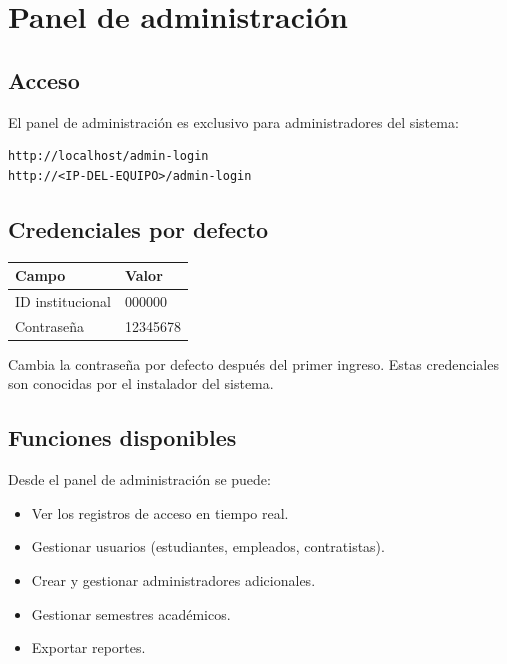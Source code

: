 \documentclass[12pt, a4paper]{article}
\begin{document}
\section{Panel de administración}

\subsection{Acceso}

El panel de administración es exclusivo para administradores del sistema:

\begin{lstlisting}
http://localhost/admin-login
http://<IP-DEL-EQUIPO>/admin-login
\end{lstlisting}

\subsection{Credenciales por defecto}

\begin{center}
\begin{tabular}{@{}ll@{}}
  \toprule
  \textbf{Campo} & \textbf{Valor} \\
  \midrule
  ID institucional & 000000 \\
  Contraseña & 12345678 \\
  \bottomrule
\end{tabular}
\end{center}

\begin{importante}
  Cambia la contraseña por defecto después del primer ingreso.
  Estas credenciales son conocidas por el instalador del sistema.
\end{importante}

\subsection{Funciones disponibles}

Desde el panel de administración se puede:
\begin{itemize}
  \item Ver los registros de acceso en tiempo real.
  \item Gestionar usuarios (estudiantes, empleados, contratistas).
  \item Crear y gestionar administradores adicionales.
  \item Gestionar semestres académicos.
  \item Exportar reportes.
\end{itemize}
\end{document}
